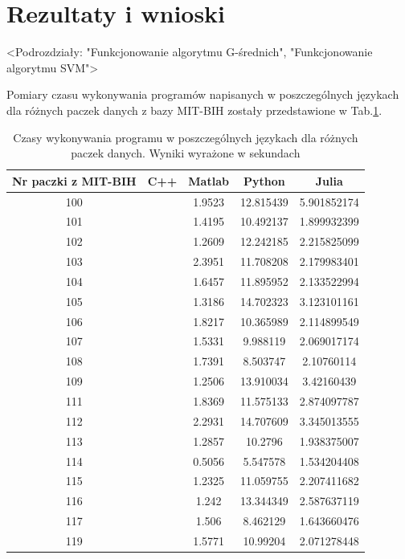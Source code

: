 \section{Rezultaty i wnioski}

<Podrozdziały: "Funkcjonowanie algorytmu G-średnich", "Funkcjonowanie algorytmu SVM">

Pomiary czasu wykonywania programów napisanych w poszczególnych językach dla różnych paczek danych z bazy MIT-BIH zostały przedstawione w Tab.\ref{tabResults}.

\begin{table}[!tp]
	\centering
	\caption{Czasy wykonywania programu w poszczególnych językach dla różnych paczek danych. Wyniki wyrażone w sekundach}
	\label{tabResults}
	\begin{tabular}{|c|c|c|c|c|}
		\hline
		Nr paczki z MIT-BIH & C++ & Matlab & Python & Julia\\ \hline		
		100 & & 1.9523 & 12.815439 & 5.901852174\\ \hline
		101 & & 1.4195 & 10.492137 & 1.899932399\\ \hline
		102 & & 1.2609 & 12.242185 & 2.215825099\\ \hline
		103 & & 2.3951 & 11.708208 & 2.179983401\\ \hline
		104 & & 1.6457 & 11.895952 & 2.133522994\\ \hline
		105 & & 1.3186 & 14.702323 & 3.123101161\\ \hline
		106 & & 1.8217 & 10.365989 & 2.114899549\\ \hline
		107 & & 1.5331 &  9.988119 & 2.069017174\\ \hline
		108 & & 1.7391 &  8.503747 & 2.10760114\\ \hline
		109 & & 1.2506 & 13.910034 & 3.42160439\\ \hline
		111 & & 1.8369 & 11.575133 & 2.874097787\\ \hline
		112 & & 2.2931 & 14.707609 & 3.345013555\\ \hline
		113 & & 1.2857 & 10.2796   & 1.938375007\\ \hline
		114 & & 0.5056 &  5.547578 & 1.534204408\\ \hline
		115 & & 1.2325 & 11.059755 & 2.207411682\\ \hline
		116 & & 1.242  & 13.344349 & 2.587637119\\ \hline
		117 & & 1.506  &  8.462129 & 1.643660476\\ \hline
		119 & & 1.5771 & 10.99204  & 2.071278448\\ \hline

\end{tabular}
\end{table}
